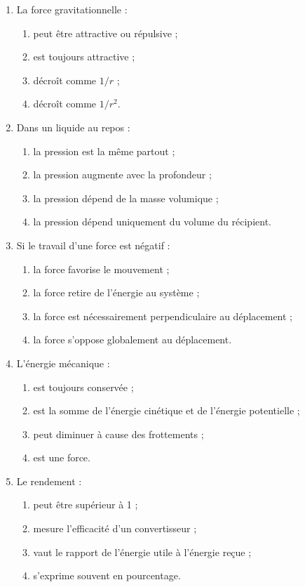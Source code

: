 \documentclass[11pt,a4paper]{article}
\begin{document}
\begin{enumerate}[label=\textbf{Q\arabic*.}]
    \item La force gravitationnelle :
    \begin{enumerate}[label=\alph*)]
        \item peut être attractive ou répulsive ;
        \item est toujours attractive ;
        \item décroît comme $1/r$ ;
        \item décroît comme $1/r^2$.
    \end{enumerate}

    \item Dans un liquide au repos :
    \begin{enumerate}[label=\alph*)]
        \item la pression est la même partout ;
        \item la pression augmente avec la profondeur ;
        \item la pression dépend de la masse volumique ;
        \item la pression dépend uniquement du volume du récipient.
    \end{enumerate}

    \item Si le travail d'une force est négatif :
    \begin{enumerate}[label=\alph*)]
        \item la force favorise le mouvement ;
        \item la force retire de l'énergie au système ;
        \item la force est nécessairement perpendiculaire au déplacement ;
        \item la force s'oppose globalement au déplacement.
    \end{enumerate}

    \item L'énergie mécanique :
    \begin{enumerate}[label=\alph*)]
        \item est toujours conservée ;
        \item est la somme de l'énergie cinétique et de l'énergie potentielle ;
        \item peut diminuer à cause des frottements ;
        \item est une force.
    \end{enumerate}

    \item Le rendement :
    \begin{enumerate}[label=\alph*)]
        \item peut être supérieur à 1 ;
        \item mesure l'efficacité d'un convertisseur ;
        \item vaut le rapport de l'énergie utile à l'énergie reçue ;
        \item s'exprime souvent en pourcentage.
    \end{enumerate}
\end{enumerate}
\end{document}
